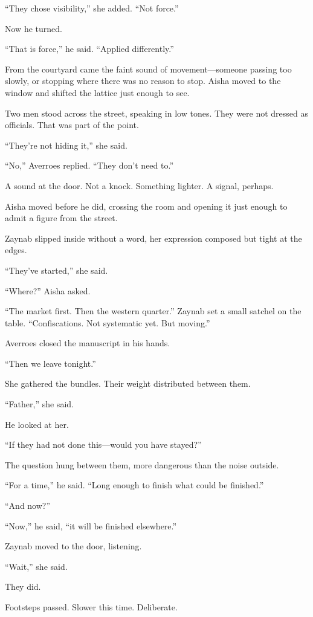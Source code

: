 ``They chose visibility,'' she added. ``Not force.''

Now he turned.

``That is force,'' he said. ``Applied differently.''

From the courtyard came the faint sound of movement---someone passing too slowly,
or stopping where there was no reason to stop. Aisha moved to the window and
shifted the lattice just enough to see.

Two men stood across the street, speaking in low tones. They were not dressed as
officials. That was part of the point.

``They're not hiding it,'' she said.

``No,'' Averroes replied. ``They don't need to.''

A sound at the door. Not a knock. Something lighter. A signal, perhaps.

Aisha moved before he did, crossing the room and opening it just enough to admit
a figure from the street.

Zaynab slipped inside without a word, her expression composed but tight at the edges.

``They've started,'' she said.

``Where?'' Aisha asked.

``The market first. Then the western quarter.'' Zaynab set a small satchel on the
table. ``Confiscations. Not systematic yet. But moving.''

Averroes closed the manuscript in his hands.

``Then we leave tonight.''

She gathered the bundles. Their weight distributed between them.

``Father,'' she said.

He looked at her.

``If they had not done this---would you have stayed?''

The question hung between them, more dangerous than the noise outside.

``For a time,'' he said. ``Long enough to finish what could be finished.''

``And now?''

``Now,'' he said, ``it will be finished elsewhere.''

Zaynab moved to the door, listening.

``Wait,'' she said.

They did.

Footsteps passed. Slower this time. Deliberate.

